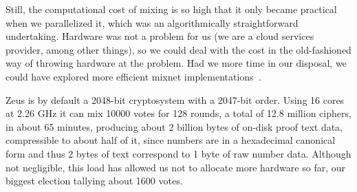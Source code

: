 \documentclass[letterpaper,10pt]{article}
\begin{document}
Still, the computational cost of mixing is so high that it only became
practical when we parallelized it, which was an algorithmically
straightforward undertaking. Hardware was not a problem for us (we are
a cloud services provider, among other things), so we could deal with
the cost in the old-fashioned way of throwing hardware at the problem.
Had we more time in our disposal, we could have explored more
efficient mixnet
implementations~\cite{bayer:2012,terelius:2010,wikstrom:2009}. 

Zeus is by default a 2048-bit cryptosystem with a 2047-bit order.
Using 16 cores at 2.26 GHz it can mix 10000 votes for 128 rounds,
a total of 12.8 million ciphers, in about 65 minutes,
producing about 2 billion bytes of on-disk proof text data,
compressible to about half of it,
since numbers are in a hexadecimal canonical form and thus
2 bytes of text correspond to 1 byte of raw number data.
Although not negligible, this load has allowed us
not to allocate more hardware so far,
our biggest election tallying about 1600 votes.

% 
% 
\end{document}
